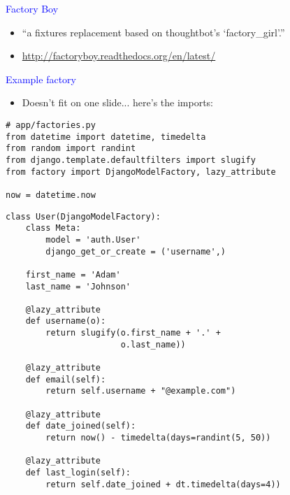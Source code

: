 \documentclass[landscape]{slides}
\begin{document}
\begin{slide}

    \textcolor{blue}{\Large{Factory Boy}}

    \begin{itemize}
        \item “a fixtures replacement based on thoughtbot’s `factory\_girl'.”
        \item \url{http://factoryboy.readthedocs.org/en/latest/}
    \end{itemize}

\end{slide}



\begin{slide}

    \textcolor{blue}{\Large{Example factory}}

    \begin{itemize}
        \item Doesn't fit on one slide... here's the imports:
    \end{itemize}

    \begin{lstlisting}
# app/factories.py
from datetime import datetime, timedelta
from random import randint
from django.template.defaultfilters import slugify
from factory import DjangoModelFactory, lazy_attribute

now = datetime.now
    \end{lstlisting}

\end{slide}




\begin{slide}

    \begin{lstlisting}
class User(DjangoModelFactory):
    class Meta:
        model = 'auth.User'
        django_get_or_create = ('username',)

    first_name = 'Adam'
    last_name = 'Johnson'

    @lazy_attribute
    def username(o):
        return slugify(o.first_name + '.' +
                       o.last_name))

    @lazy_attribute
    def email(self):
        return self.username + "@example.com")

    @lazy_attribute
    def date_joined(self):
        return now() - timedelta(days=randint(5, 50))

    @lazy_attribute
    def last_login(self):
        return self.date_joined + dt.timedelta(days=4))
    \end{lstlisting}

\end{slide}
\end{document}
